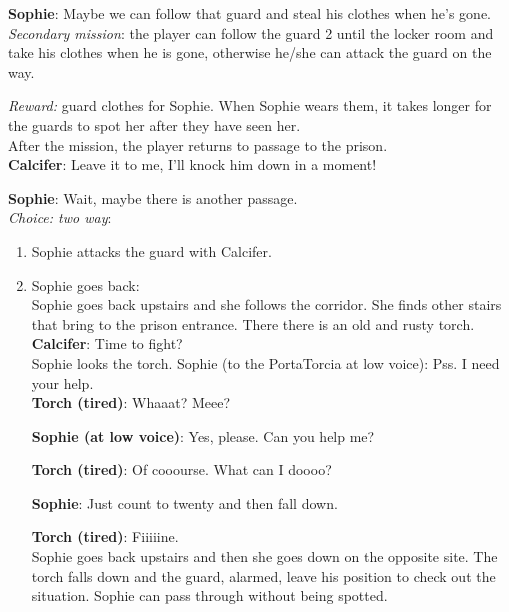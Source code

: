 \textbf{Sophie}: Maybe we can follow that guard and steal his clothes when he’s gone.\\

\textit{Secondary mission}: the player can follow the guard 2 until the locker room and take his clothes when he is gone, otherwise he/she can attack the guard on the way.

\textit{Reward:} guard clothes for Sophie. When Sophie wears them, it takes longer for the guards to spot her after they have seen her.\\

\noindent After the mission, the player returns to passage to the prison.\\

\textbf{Calcifer}: Leave it to me, I’ll knock him down in a moment!

\textbf{Sophie}: Wait, maybe there is another passage.\\

\textit{Choice: two way}:
\begin{enumerate}
\item Sophie attacks the guard with Calcifer.
\item Sophie goes back:\\

  Sophie goes back upstairs and she follows the corridor. She finds other stairs that bring to the prison entrance. There there is an old and rusty torch.\\
  
  \textbf{Calcifer}: Time to fight?\\

  \noindent Sophie looks the torch. Sophie (to the PortaTorcia at low voice): Pss. I need your help.\\

  \textbf{Torch (tired)}: Whaaat? Meee?

\textbf{Sophie (at low voice)}: Yes, please. Can you help me?

\textbf{Torch (tired)}: Of cooourse. What can I doooo?

\textbf{Sophie}: Just count to twenty and then fall down.

\textbf{Torch (tired)}: Fiiiiine.\\

\noindent Sophie goes back upstairs and then she goes down on the opposite site. The torch falls down and the guard, alarmed, leave his position to check out the situation.
Sophie can pass through without being spotted.
  
  \end{enumerate}


